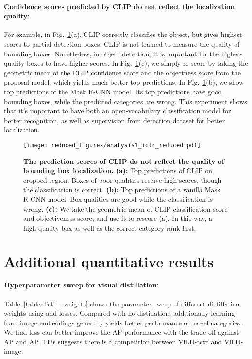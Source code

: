 \documentclass{article} \usepackage{iclr2022_conference,times}
\begin{document}
\paragraph{Confidence scores predicted by CLIP do not reflect the localization quality:} For example, in Fig.~\ref{fig:analysis1}(a), CLIP correctly classifies the object, but gives highest scores to partial detection boxes. CLIP is not trained
to measure the quality of bounding boxes. Nonetheless, in object detection, it is important for the higher-quality boxes to have higher scores. In Fig.~\ref{fig:analysis1}(c), we simply re-score by taking the geometric mean of the CLIP confidence score and the objectness score from the proposal model, which yields much better top predictions. In Fig.~\ref{fig:analysis1}(b), we show top predictions of the Mask R-CNN model. Its top predictions have good bounding boxes, while the predicted categories are wrong. 
This experiment shows that it's important to have both an open-vocabulary classification model for better recognition, as well as supervision from detection dataset for better localization.
\begin{figure}[h]
\centering
    \texttt{[image: reduced\_figures/analysis1\_iclr\_reduced.pdf]}
    \vspace{-3.5ex}
    \caption{\textbf{The prediction scores of CLIP do not reflect the quality of bounding box localization.}
    \textbf{(a):} Top predictions of CLIP on cropped region. Boxes of poor qualities receive high scores, though the classification is correct. \textbf{(b):} Top predictions of a vanilla Mask R-CNN model. Box qualities are good while the classification is wrong. \textbf{(c):} We take the geometric mean of CLIP classification score and objectiveness score, and use it to rescore (a). In this way, a high-quality box as well as the correct category rank first.}
    \label{fig:analysis1}
    \vspace{1ex}
\end{figure}





\section{Additional quantitative results}\label{appendix_sec:quantitative}

\paragraph{Hyperparameter sweep for visual distillation:}
Table~\ref{table:distill_weights} shows the parameter sweep of different distillation weights using  and  losses.
Compared with no distillation, additionally learning from image embeddings generally yields better performance on novel categories.
We find  loss can better improve the AP performance with the trade-off against AP and AP. This suggests there is a competition between ViLD-text and ViLD-image.
\end{document}
